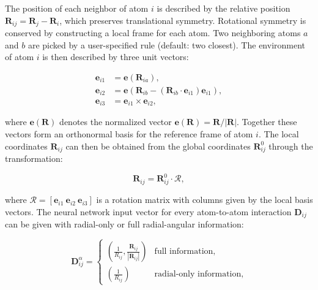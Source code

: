The position of each neighbor of atom $i$ is described
by the relative position $\bm{R}_{ij} = \bm{R}_j - \bm{R}_i$,
which preserves translational symmetry.
Rotational symmetry is conserved by constructing a local frame
for each atom. Two neighboring atoms $a$ and $b$ are picked by a
user-specified rule (default: two closest).
The environment of atom $i$ is then described by three unit vectors:

\begin{equation}
\begin{split}
    \bm{e}_{i1} &= \bm{e}(\bm{R}_{ia}) , \\
    \bm{e}_{i2} &= \bm{e}(\bm{R}_{ib} - (\bm{R}_{ib} \cdot \bm{e}_{i1})
    \bm{e}_{i1}) , \\
    \bm{e}_{i3} &= \bm{e}_{i1} \times \bm{e}_{i2} ,
\end{split}
\end{equation}

where $\bm{e}(\bm{R})$ denotes the normalized vector $\bm{e}(\bm{R})
    = \bm{R} / \left| \bm{R} \right|$. Together these vectors
form an orthonormal basis for the reference frame of atom $i$.
The local coordinates $\bm{R}_{ij}$
can then be obtained from the global coordinates $\bm{R}_{ij}^0$
through the transformation:

\begin{equation}
    \bm{R}_{ij} = \bm{R}_{ij}^0 \cdot \mathcal{R} ,
\end{equation}

where $\mathcal{R} = [\bm{e}_{i1} \ \bm{e}_{i2} \ \bm{e}_{i3}]$
is a rotation matrix with columns given by the local basis vectors.
The neural network input vector for every atom-to-atom interaction
$\bm{D}_{ij}$ can be given with radial-only or full radial-angular
information:

\begin{equation}
    \bm{D}_{ij}^{\alpha} =
\begin{cases}
    \displaystyle\left( \frac{1}{R_{ij}}, \frac{\bm{R}_{ij}}{\left| \bm{R}_{ij} \right|}
    \right) & \text{full information}, \\[10pt]
    \displaystyle\left( \frac{1}{R_{ij}} \right) & \text{radial-only information},
\end{cases}
\end{equation}

